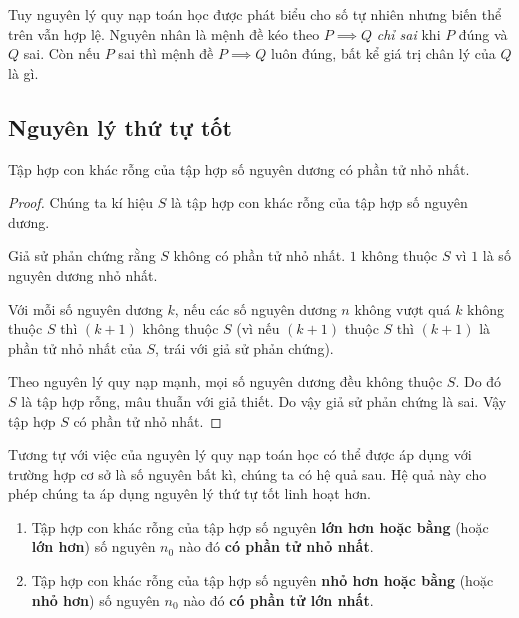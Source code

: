 Tuy nguyên lý quy nạp toán học được phát biểu cho số tự nhiên nhưng biến thể trên vẫn hợp lệ. Nguyên nhân là mệnh đề kéo theo $P\implies Q$ \textit{chỉ sai} khi $P$ đúng và $Q$ sai. Còn nếu $P$ sai thì mệnh đề $P\implies Q$ luôn đúng, bất kể giá trị chân lý của $Q$ là gì.

\begin{theorem}
\end{theorem}

\subsection{Nguyên lý thứ tự tốt}

\begin{theorem}
	Tập hợp con khác rỗng của tập hợp số nguyên dương có phần tử nhỏ nhất.
\end{theorem}

\begin{proof}
	Chúng ta kí hiệu $S$ là tập hợp con khác rỗng của tập hợp số nguyên dương.

	Giả sử phản chứng rằng $S$ không có phần tử nhỏ nhất. $1$ không thuộc $S$ vì $1$ là số nguyên dương nhỏ nhất.

	Với mỗi số nguyên dương $k$, nếu các số nguyên dương $n$ không vượt quá $k$ không thuộc $S$ thì $(k+1)$ không thuộc $S$ (vì nếu $(k+1)$ thuộc $S$ thì $(k+1)$ là phần tử nhỏ nhất của $S$, trái với giả sử phản chứng).

	Theo nguyên lý quy nạp mạnh, mọi số nguyên dương đều không thuộc $S$. Do đó $S$ là tập hợp rỗng, mâu thuẫn với giả thiết. Do vậy giả sử phản chứng là sai. Vậy tập hợp $S$ có phần tử nhỏ nhất.
\end{proof}

Tương tự với việc của nguyên lý quy nạp toán học có thể được áp dụng với trường hợp cơ sở là số nguyên bất kì, chúng ta có hệ quả sau. Hệ quả này cho phép chúng ta áp dụng nguyên lý thứ tự tốt linh hoạt hơn.
\begin{corollary}
	\begin{enumerate}[label={(\roman*)}]
		\item Tập hợp con khác rỗng của tập hợp số nguyên \textbf{lớn hơn hoặc bằng} (hoặc \textbf{lớn hơn}) số nguyên $n_{0}$ nào đó \textbf{có phần tử nhỏ nhất}.
		\item Tập hợp con khác rỗng của tập hợp số nguyên \textbf{nhỏ hơn hoặc bằng} (hoặc \textbf{nhỏ hơn}) số nguyên $n_{0}$ nào đó \textbf{có phần tử lớn nhất}.
	\end{enumerate}
\end{corollary}


